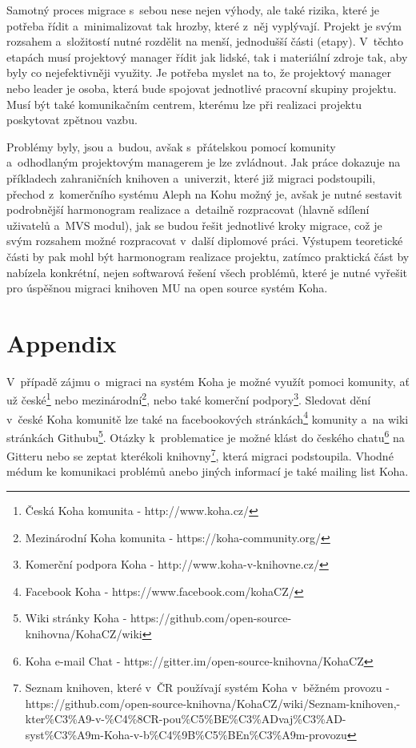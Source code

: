 \documentclass[
	11pt, oneside, printed, final, palatino, monochrome
	microtype,
	table,   %
	lof,     %
	lot     %
]{fithesis3}
\begin{document}
{ Samotný proces migrace s~sebou nese nejen výhody, ale také rizika, které je potřeba řídit a~minimalizovat tak hrozby, které z~něj vyplývají. Projekt je svým rozsahem a~složitostí nutné rozdělit na menší, jednodušší části (etapy). V~těchto etapách musí projektový manager řídit jak lidské, tak i materiální zdroje tak, aby byly co nejefektivněji využity. Je potřeba myslet na to, že projektový manager nebo leader je osoba, která bude spojovat jednotlivé pracovní skupiny projektu. Musí být také komunikačním centrem, kterému lze při realizaci projektu poskytovat zpětnou vazbu. 
 
  Problémy byly, jsou a~budou, avšak s~přátelskou pomocí komunity a~odhodlaným projektovým managerem je lze zvládnout. Jak práce dokazuje na příkladech zahraničních knihoven a~univerzit, které již migraci podstoupili, přechod z~komerčního systému Aleph na Kohu možný je, avšak je nutné sestavit podrobnější harmonogram realizace a~detailně rozpracovat (hlavně sdílení uživatelů a~MVS modul), jak se budou řešit jednotlivé kroky migrace, což je svým rozsahem možné rozpracovat v~další diplomové práci. Výstupem teoretické části by pak mohl být harmonogram realizace projektu, zatímco praktická část by nabízela konkrétní, nejen softwarová řešení všech problémů, které je nutné vyřešit pro úspěšnou migraci knihoven MU na open source systém Koha.

\chapter*{Appendix}
V~případě zájmu o~migraci na systém Koha je možné využít pomoci komunity, ať už české\footnote{Česká Koha komunita - http://www.koha.cz/} nebo mezinárodní\footnote{Mezinárodní Koha komunita - https://koha-community.org/
}, nebo také komerční podpory\footnote{Komerční podpora Koha - http://www.koha-v-knihovne.cz/}.
Sledovat dění v~české Koha komunitě lze také na facebookových stránkách\footnote{Facebook Koha - https://www.facebook.com/kohaCZ/
} komunity a~na wiki stránkách Githubu\footnote{Wiki stránky Koha -  https://github.com/open-source-knihovna/KohaCZ/wiki
}. Otázky k~problematice je možné klást do českého chatu\footnote{Koha e-mail Chat - https://gitter.im/open-source-knihovna/KohaCZ} na Gitteru nebo se zeptat kterékoli knihovny\footnote{Seznam knihoven, které v~ČR používají systém Koha v~běžném provozu - https://github.com/open-source-knihovna/KohaCZ/wiki/Seznam-knihoven,-kter\%C3\%A9-v-\%C4\%8CR-pou\%C5\%BE\%C3\%ADvaj\%C3\%AD-syst\%C3\%A9m-Koha-v-b\%C4\%9B\%C5\%BEn\%C3\%A9m-provozu
}, která migraci podstoupila. Vhodné médum ke komunikaci problémů anebo jiných informací je také mailing list Koha.

}
\end{document}
